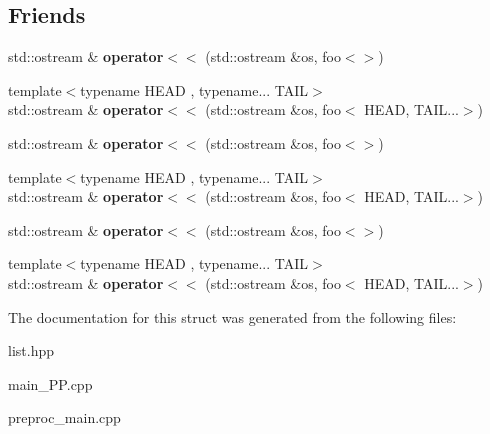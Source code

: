 \subsection*{Friends}
\begin{DoxyCompactItemize}
\item 
\hypertarget{structtml_1_1impl_1_1to__string_3_01tml_1_1list_3_01Ts_8_8_8_4_01_4_a33a4a844f63a154e40604f7a7c837c4d}{std\+::ostream \& {\bfseries operator$<$$<$} (std\+::ostream \&os, foo$<$$>$)}\label{structtml_1_1impl_1_1to__string_3_01tml_1_1list_3_01Ts_8_8_8_4_01_4_a33a4a844f63a154e40604f7a7c837c4d}

\item 
\hypertarget{structtml_1_1impl_1_1to__string_3_01tml_1_1list_3_01Ts_8_8_8_4_01_4_a1603311c53e22c3f99695f06edd128f8}{{\footnotesize template$<$typename H\+E\+A\+D , typename... T\+A\+I\+L$>$ }\\std\+::ostream \& {\bfseries operator$<$$<$} (std\+::ostream \&os, foo$<$ H\+E\+A\+D, T\+A\+I\+L...$>$)}\label{structtml_1_1impl_1_1to__string_3_01tml_1_1list_3_01Ts_8_8_8_4_01_4_a1603311c53e22c3f99695f06edd128f8}

\item 
\hypertarget{structtml_1_1impl_1_1to__string_3_01tml_1_1list_3_01Ts_8_8_8_4_01_4_a33a4a844f63a154e40604f7a7c837c4d}{std\+::ostream \& {\bfseries operator$<$$<$} (std\+::ostream \&os, foo$<$$>$)}\label{structtml_1_1impl_1_1to__string_3_01tml_1_1list_3_01Ts_8_8_8_4_01_4_a33a4a844f63a154e40604f7a7c837c4d}

\item 
\hypertarget{structtml_1_1impl_1_1to__string_3_01tml_1_1list_3_01Ts_8_8_8_4_01_4_a1603311c53e22c3f99695f06edd128f8}{{\footnotesize template$<$typename H\+E\+A\+D , typename... T\+A\+I\+L$>$ }\\std\+::ostream \& {\bfseries operator$<$$<$} (std\+::ostream \&os, foo$<$ H\+E\+A\+D, T\+A\+I\+L...$>$)}\label{structtml_1_1impl_1_1to__string_3_01tml_1_1list_3_01Ts_8_8_8_4_01_4_a1603311c53e22c3f99695f06edd128f8}

\item 
\hypertarget{structtml_1_1impl_1_1to__string_3_01tml_1_1list_3_01Ts_8_8_8_4_01_4_a33a4a844f63a154e40604f7a7c837c4d}{std\+::ostream \& {\bfseries operator$<$$<$} (std\+::ostream \&os, foo$<$$>$)}\label{structtml_1_1impl_1_1to__string_3_01tml_1_1list_3_01Ts_8_8_8_4_01_4_a33a4a844f63a154e40604f7a7c837c4d}

\item 
\hypertarget{structtml_1_1impl_1_1to__string_3_01tml_1_1list_3_01Ts_8_8_8_4_01_4_a1603311c53e22c3f99695f06edd128f8}{{\footnotesize template$<$typename H\+E\+A\+D , typename... T\+A\+I\+L$>$ }\\std\+::ostream \& {\bfseries operator$<$$<$} (std\+::ostream \&os, foo$<$ H\+E\+A\+D, T\+A\+I\+L...$>$)}\label{structtml_1_1impl_1_1to__string_3_01tml_1_1list_3_01Ts_8_8_8_4_01_4_a1603311c53e22c3f99695f06edd128f8}

\end{DoxyCompactItemize}


The documentation for this struct was generated from the following files\+:\begin{DoxyCompactItemize}
\item 
list.\+hpp\item 
main\+\_\+\+P\+P.\+cpp\item 
preproc\+\_\+main.\+cpp\end{DoxyCompactItemize}
